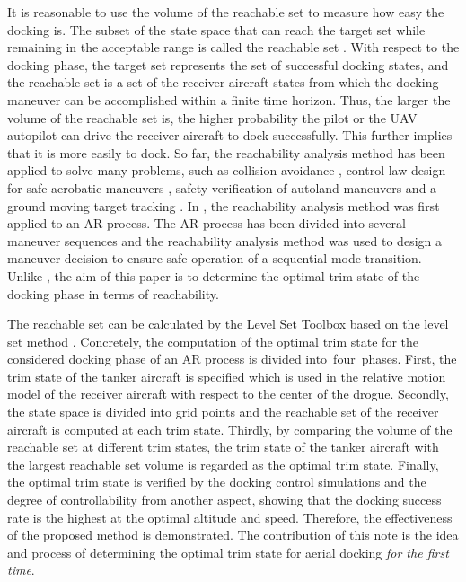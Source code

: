 It is reasonable to use the volume of the reachable set to measure how easy
the docking is. The subset of the state space that can reach the target set
while remaining in the acceptable range is called the reachable set \cite{14}%
. With respect to the docking phase, the target set represents the set of
successful docking states, and the reachable set is a set of the receiver
aircraft states from which the docking maneuver can be accomplished within a
finite time horizon. Thus, the larger the volume of the reachable set is,
the higher probability the pilot or the UAV autopilot can drive the receiver
aircraft to dock successfully. This further implies that it is more easily
to dock. So far, the reachability analysis method has been applied to solve
many problems, such as collision avoidance \cite{14}, control law design for
safe aerobatic maneuvers \cite{15} \cite{16}, safety verification of
autoland maneuvers \cite{17} and a ground moving target tracking \cite{18}.
In \cite{19}, the reachability analysis method was first applied to an AR
process. The AR process has been divided into several maneuver sequences and
the reachability analysis method was used to design a maneuver decision to
ensure safe operation of a sequential mode transition. Unlike \cite{19}, the
aim of this paper is to determine the optimal trim state of the docking
phase in terms of reachability.

The reachable set can be calculated by the Level Set Toolbox \cite{20} based
on the level set method \cite{21}. Concretely, the computation of the
optimal trim state for the considered docking phase of an AR process is
divided into\ four\ phases. First, the trim state of the tanker aircraft is
specified which is used in the relative motion model of the receiver
aircraft with respect to the center of the drogue. Secondly, the state space
is divided into grid points and the reachable set of the receiver aircraft
is computed at each trim state. Thirdly, by comparing the volume of the
reachable set at different trim states, the trim state of the tanker
aircraft with the largest reachable set volume is regarded as the optimal
trim state. Finally, the optimal trim state is verified by the docking
control simulations and the degree of controllability from another aspect,
showing that the docking success rate is the highest at the optimal altitude
and speed. Therefore, the effectiveness of the proposed method is
demonstrated. The contribution of this note is the idea and process of
determining the optimal trim state for aerial docking \textit{for the first
	time}.

